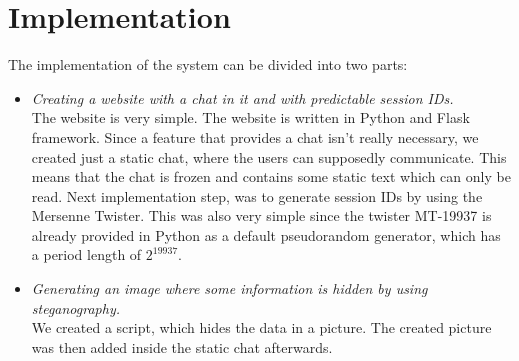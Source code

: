 \documentclass[11pt]{article}
\begin{document}
\section{Implementation}

The implementation of the system can be divided into two parts:
\begin{itemize}
	\item \textit{Creating a website with a chat in it and with predictable session IDs.} \\
	 The website is very simple. The website is written in Python and Flask framework. Since a feature that provides a chat isn't really necessary, we created just a static chat, where the users can supposedly communicate. This means that the chat is frozen and contains some static text which can only be read. Next implementation step, was to generate session IDs by using the Mersenne Twister. This was also very simple since the twister MT-19937 is already provided in Python as a default pseudorandom generator, which has a period length of $2^{19937}$.
	\item \textit{Generating an image where some information is hidden by using steganography.}\\
	We created a script, which hides the data in a picture. The created picture was then added inside the static chat afterwards.
\end{itemize}

\begin{spacing}{1}
  
  
\end{spacing}
\end{document}
